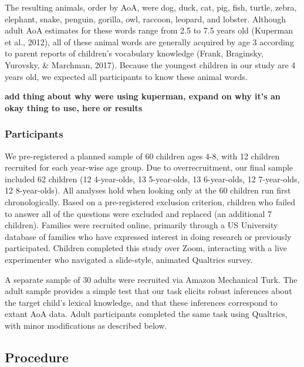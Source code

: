 \documentclass[10pt, letterpaper]{article}
\begin{document}
The resulting animals, order by AoA, were dog, duck, cat, pig, fish,
turtle, zebra, elephant, snake, penguin, gorilla, owl, raccoon, leopard,
and lobster. Although adult AoA estimates for these words range from 2.5
to 7.5 years old (Kuperman et al., 2012), all of these animal words are
generally acquired by age 3 according to parent reports of children's
vocabulary knowledge (Frank, Braginsky, Yurovsky, \& Marchman, 2017).
Because the youngest children in our study are 4 years old, we expected
all participants to know these animal words.

\textbf{add thing about why were using kuperman, expand on why it's an
okay thing to use, here or results}

\hypertarget{participants}{%
\subsubsection{Participants}\label{participants}}

We pre-registered a planned sample of 60 children ages 4-8, with 12
children recruited for each year-wise age group. Due to overrecruitment,
our final sample included 62 children (12 4-year-olds, 13 5-year-olds,
13 6-year-olds, 12 7-year-olds, 12 8-year-olds). All analyses hold when
looking only at the 60 children run first chronologically. Based on a
pre-registered exclusion criterion, children who failed to answer all of
the questions were excluded and replaced (an additional 7 children).
Families were recruited online, primarily through a US University
database of families who have expressed interest in doing research or
previously participated. Children completed this study over Zoom,
interacting with a live experimenter who navigated a slide-style,
animated Qualtrics survey.

A separate sample of 30 adults were recruited via Amazon Mechanical
Turk. The adult sample provides a simple test that our task elicits
robust inferences about the target child's lexical knowledge, and that
these inferences correspond to extant AoA data. Adult participants
completed the same task using Qualtrics, with minor modifications as
described below.

\hypertarget{procedure}{%
\subsection{Procedure}\label{procedure}}
\end{document}
